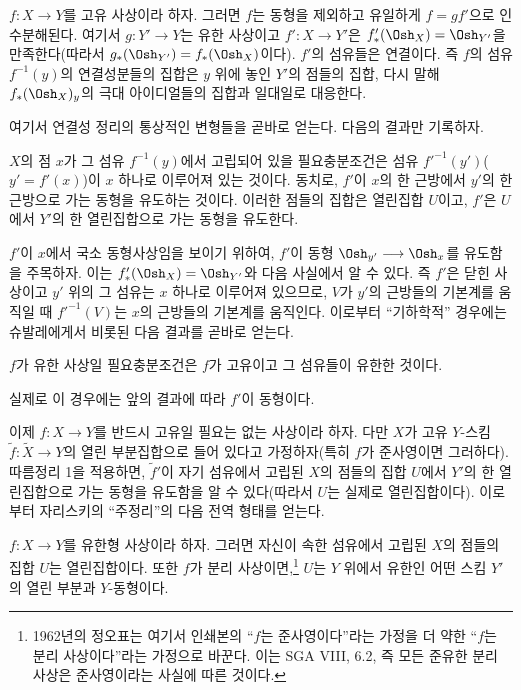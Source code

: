  $f:X\longrightarrow Y$를
고유 사상이라 하자. 그러면 $f$는 동형을 제외하고 유일하게 $f=gf'$으로
인수분해된다. 여기서 $g:Y'\longrightarrow Y$는 유한 사상이고
$f':X\longrightarrow Y'$은 $f'_*(\Osh_X)=\Osh_{Y'}$을 만족한다(따라서
$g_*(\Osh_{Y'})=f_*(\Osh_X)$이다). $f'$의 섬유들은 연결이다. 즉 $f$의
섬유 $f^{-1}(y)$의 연결성분들의 집합은 $y$ 위에 놓인 $Y'$의 점들의
집합, 다시 말해 $f_*(\Osh_X)_y$의 극대 아이디얼들의 집합과 일대일로
대응한다.

여기서 연결성 정리의 통상적인 변형들을 곧바로 얻는다. 다음의 결과만
기록하자.

 $X$의 점 $x$가 그 섬유 $f^{-1}(y)$에서 고립되어
있을 필요충분조건은 섬유 $f'^{-1}(y')$($y'=f'(x)$)이 $x$ 하나로
이루어져 있는 것이다. 동치로, $f'$이 $x$의 한 근방에서 $y'$의 한
근방으로 가는 동형을 유도하는 것이다. 이러한 점들의 집합은 열린집합
$U$이고, $f'$은 $U$에서 $Y'$의 한 열린집합으로 가는 동형을 유도한다.

$f'$이 $x$에서 국소 동형사상임을 보이기 위하여, $f'$이 동형
$\Osh_{y'}\longrightarrow\Osh_x$를 유도함을 주목하자. 이는
$f'_*(\Osh_X)=\Osh_{Y'}$와 다음 사실에서 알 수 있다. 즉 $f'$은 닫힌
사상이고 $y'$ 위의 그 섬유는 $x$ 하나로 이루어져 있으므로, $V$가
$y'$의 근방들의 기본계를 움직일 때 $f'^{-1}(V)$는 $x$의 근방들의
기본계를 움직인다. 이로부터 ``기하학적'' 경우에는 슈발레에게서 비롯된
다음 결과를 곧바로 얻는다.

 $f$가 유한 사상일 필요충분조건은 $f$가 고유이고
그 섬유들이 유한한 것이다.

실제로 이 경우에는 앞의 결과에 따라 $f'$이 동형이다.

이제 $f:X\longrightarrow Y$를 반드시 고유일 필요는 없는 사상이라 하자.
다만 $X$가 고유 $Y$-스킴
$\widetilde f:\widetilde X\longrightarrow Y$의 열린 부분집합으로 들어
있다고 가정하자(특히 $f$가 준사영이면 그러하다). 따름정리 1을 적용하면,
$\widetilde f'$이 자기 섬유에서 고립된 $X$의 점들의 집합 $U$에서
$Y'$의 한 열린집합으로 가는 동형을 유도함을 알 수 있다(따라서 $U$는
실제로 열린집합이다). 이로부터 자리스키의 ``주정리''의 다음 전역 형태를
얻는다.

 $f:X\longrightarrow Y$를
유한형 사상이라 하자. 그러면 자신이 속한 섬유에서 고립된 $X$의 점들의 집합
$U$는 열린집합이다. 또한 $f$가 분리 사상이면,\footnote{1962년의 정오표는
여기서 인쇄본의 ``$f$는 준사영이다''라는 가정을 더 약한 ``$f$는 분리
사상이다''라는 가정으로 바꾼다. 이는 SGA VIII, 6.2, 즉 모든 준유한 분리
사상은 준사영이라는 사실에 따른 것이다.} $U$는 $Y$ 위에서 유한인 어떤
스킴 $Y'$의 열린 부분과 $Y$-동형이다.

